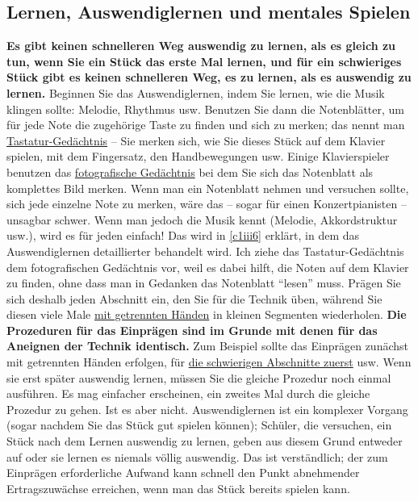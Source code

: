 
\label{c1ii12}


\subsection{Lernen, Auswendiglernen und mentales Spielen}

\textbf{Es gibt keinen schnelleren Weg auswendig zu lernen, als es gleich zu tun, wenn Sie ein Stück das erste Mal lernen, und für ein schwieriges Stück gibt es keinen schnelleren Weg, es zu lernen, als es auswendig zu lernen.}
Beginnen Sie das Auswendiglernen, indem Sie lernen, wie die Musik klingen sollte: Melodie, Rhythmus usw.
Benutzen Sie dann die Notenblätter, um für jede Note die zugehörige Taste zu finden und sich zu merken; das nennt man \hyperref[c1iii6tastatur]{Tastatur-Gedächtnis} -- Sie merken sich, wie Sie dieses Stück auf dem Klavier spielen, mit dem Fingersatz, den Handbewegungen usw.
Einige Klavierspieler benutzen das \hyperref[c1iii6foto]{fotografische Gedächtnis} bei dem Sie sich das Notenblatt als komplettes Bild merken.
Wenn man ein Notenblatt nehmen und versuchen sollte, sich jede einzelne Note zu merken, wäre das -- sogar für einen Konzertpianisten -- unsagbar schwer.
Wenn man jedoch die Musik kennt (Melodie, Akkordstruktur usw.), wird es für jeden einfach!
Das wird in \hyperref[c1iii6]{\autoref{c1iii6}} erklärt, in dem das Auswendiglernen detaillierter behandelt wird.
Ich ziehe das Tastatur-Gedächtnis dem fotografischen Gedächtnis vor, weil es dabei hilft, die Noten auf dem Klavier zu finden, ohne dass man in Gedanken das Notenblatt \enquote{lesen} muss.
Prägen Sie sich deshalb jeden Abschnitt ein, den Sie für die Technik üben, während Sie diesen viele Male \hyperref[c1ii7]{mit getrennten Händen} in kleinen Segmenten wiederholen.
\textbf{Die Prozeduren für das Einprägen sind im Grunde mit denen für das Aneignen der Technik identisch.}
Zum Beispiel sollte das Einprägen zunächst mit getrennten Händen erfolgen, für \hyperref[c1ii5]{die schwierigen Abschnitte zuerst} usw.
Wenn sie erst später auswendig lernen, müssen Sie die gleiche Prozedur noch einmal ausführen.
Es mag einfacher erscheinen, ein zweites Mal durch die gleiche Prozedur zu gehen.
Ist es aber nicht.
Auswendiglernen ist ein komplexer Vorgang (sogar nachdem Sie das Stück gut spielen können); Schüler, die versuchen, ein Stück nach dem Lernen auswendig zu lernen, geben aus diesem Grund entweder auf oder sie lernen es niemals völlig auswendig.
Das ist verständlich; der zum Einprägen erforderliche Aufwand kann schnell den Punkt abnehmender Ertragszuwächse erreichen, wenn man das Stück bereits spielen kann.

